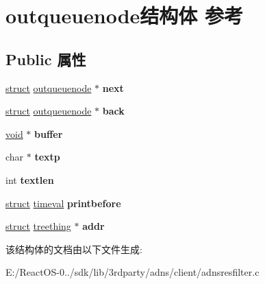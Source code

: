 \hypertarget{structoutqueuenode}{}\section{outqueuenode结构体 参考}
\label{structoutqueuenode}
\subsection*{Public 属性}
\begin{DoxyCompactItemize}
\item 
\mbox{\label{structoutqueuenode_abb3860fd34e60f3bc5b0cdf3ad460000}} 
\hyperlink{interfacestruct}{struct} \hyperlink{structoutqueuenode}{outqueuenode} $\ast$ {\bfseries next}
\item 
\mbox{\label{structoutqueuenode_ae102aa73df05f5b7449ef868bb0d3ed2}} 
\hyperlink{interfacestruct}{struct} \hyperlink{structoutqueuenode}{outqueuenode} $\ast$ {\bfseries back}
\item 
\mbox{\label{structoutqueuenode_a607ec07593230b62bfe829d7cef8ef2f}} 
\hyperlink{interfacevoid}{void} $\ast$ {\bfseries buffer}
\item 
\mbox{\label{structoutqueuenode_a589ef9ed80b10d33be859f776aa2d2c7}} 
char $\ast$ {\bfseries textp}
\item 
\mbox{\label{structoutqueuenode_adbd228e248cf7ad18b2d53a7f24cf7d1}} 
int {\bfseries textlen}
\item 
\mbox{\label{structoutqueuenode_a5b713a08f5babf5377b7134ae0c15413}} 
\hyperlink{interfacestruct}{struct} \hyperlink{structtimeval}{timeval} {\bfseries printbefore}
\item 
\mbox{\label{structoutqueuenode_a02ee46cbc415c2296e3600260ae45c85}} 
\hyperlink{interfacestruct}{struct} \hyperlink{structtreething}{treething} $\ast$ {\bfseries addr}
\end{DoxyCompactItemize}


该结构体的文档由以下文件生成\+:\begin{DoxyCompactItemize}
\item 
E\+:/\+React\+O\+S-\/0../sdk/lib/3rdparty/adns/client/adnsresfilter.\+c\end{DoxyCompactItemize}
